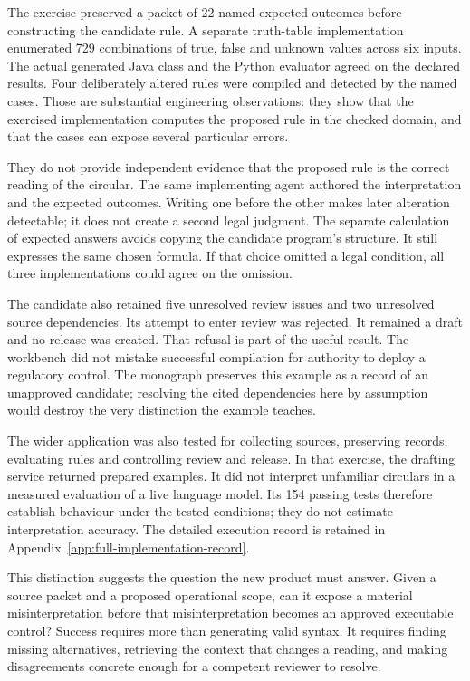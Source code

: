 The exercise preserved a packet of 22 named expected outcomes before constructing
the candidate rule. A separate truth-table implementation enumerated 729
combinations of true, false and unknown values across six inputs. The actual
generated Java class and the Python evaluator agreed on the declared results.
Four deliberately altered rules were compiled and detected by the named cases.
Those are substantial engineering observations: they show that the exercised
implementation computes the proposed rule in the checked domain, and that the
cases can expose several particular errors.

They do not provide independent evidence that the proposed rule is the correct
reading of the circular. The same implementing agent authored the interpretation
and the expected outcomes. Writing one before the other makes later alteration
detectable; it does not create a second legal judgment. The separate calculation
of expected answers avoids copying the candidate program's structure. It still
expresses the same chosen formula. If that choice omitted a legal condition,
all three implementations could agree on the omission.


The candidate also retained five unresolved review issues and two unresolved
source dependencies. Its attempt to enter review was rejected. It remained a
draft and no release was created. That refusal is part of the useful result.
The workbench did not mistake successful compilation for authority to deploy a
regulatory control. The monograph preserves this example as a record of an
unapproved candidate; resolving the cited dependencies here by assumption would
destroy the very distinction the example teaches.

The wider application was also tested for collecting sources, preserving records,
evaluating rules and controlling review and release. In that exercise, the
drafting service returned prepared examples. It did not interpret unfamiliar
circulars in a measured evaluation of a live language model. Its 154 passing
tests therefore establish behaviour under the tested conditions; they do not
estimate interpretation accuracy. The detailed execution record is retained in
Appendix~\ref{app:full-implementation-record}.

This distinction suggests the question the new product must answer. Given a
source packet and a proposed operational scope, can it expose a material
misinterpretation before that misinterpretation becomes an approved executable
control? Success requires more than generating valid syntax. It requires finding
missing alternatives, retrieving the context that changes a reading, and making
disagreements concrete enough for a competent reviewer to resolve.


